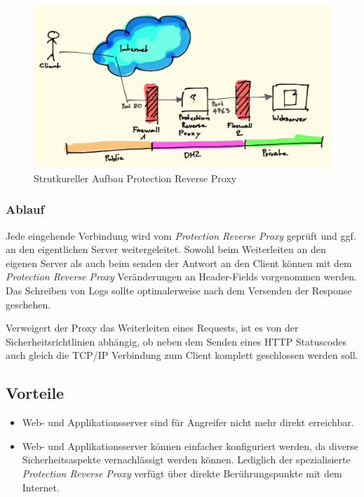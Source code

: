 \begin{figure}[H]
	\centering
	\includegraphics[width=12cm]{content/secure-internet-applications/images/protection-reverse-proxy.png}
	\caption{Strutkureller Aufbau Protection Reverse Proxy}
\end{figure}

\subsubsection*{Ablauf}
Jede eingehende Verbindung wird vom \emph{Protection Reverse Proxy} geprüft und ggf. an den eigentlichen Server weitergeleitet. Sowohl beim Weiterleiten an den eigenen Server als auch beim senden der Antwort an den Client können mit dem \emph{Protection Reverse Proxy} Veränderungen an Header-Fields vorgenommen werden. Das Schreiben von Logs sollte optimalerweise nach dem Versenden der Response geschehen.

Verweigert der Proxy das Weiterleiten eines Requests, ist es von der Sicherheitsrichtlinien abhängig, ob neben dem Senden eines HTTP Statuscodes auch gleich die TCP/IP Verbindung zum Client komplett geschlossen werden soll.

\subsection*{Vorteile}
\begin{itemize}
	\item Web- und Applikationsserver sind für Angreifer nicht mehr direkt erreichbar.
	\item Web- und Applikationsserver können einfacher konfiguriert werden, da diverse Sicherheitsaspekte vernachlässigt werden können. Lediglich der spezialisierte \emph{Protection Reverse Proxy} verfügt über direkte Berührungspunkte mit dem Internet.
\end{itemize}

